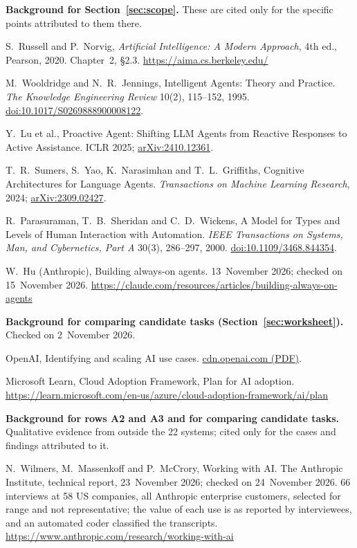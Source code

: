 \documentclass[10pt]{article}
\begin{document}
\textbf{Background for Section~\ref{sec:scope}.} These are cited only for the specific points attributed to them there.
{\small
\begin{enumerate}[label={[\arabic*]},leftmargin=2.2em,start=23]
\item S.~Russell and P.~Norvig, \emph{Artificial Intelligence: A Modern Approach}, 4th ed., Pearson, 2020. Chapter~2, \S2.3. \url{https://aima.cs.berkeley.edu/}
\item M.~Wooldridge and N.~R.~Jennings, Intelligent Agents: Theory and Practice. \emph{The Knowledge Engineering Review} 10(2), 115--152, 1995. \href{https://doi.org/10.1017/S0269888900008122}{doi:10.1017/S0269888900008122}.
\item Y.~Lu et al., Proactive Agent: Shifting LLM Agents from Reactive Responses to Active Assistance. ICLR 2025; \href{https://arxiv.org/abs/2410.12361}{arXiv:2410.12361}.
\item T.~R.~Sumers, S.~Yao, K.~Narasimhan and T.~L.~Griffiths, Cognitive Architectures for Language Agents. \emph{Transactions on Machine Learning Research}, 2024; \href{https://arxiv.org/abs/2309.02427}{arXiv:2309.02427}.
\item R.~Parasuraman, T.~B.~Sheridan and C.~D.~Wickens, A Model for Types and Levels of Human Interaction with Automation. \emph{IEEE Transactions on Systems, Man, and Cybernetics, Part A} 30(3), 286--297, 2000. \href{https://doi.org/10.1109/3468.844354}{doi:10.1109/3468.844354}.
\item W.~Hu (Anthropic), Building always-on agents. 13~November 2026; checked on 15~November 2026. \url{https://claude.com/resources/articles/building-always-on-agents}
\end{enumerate}
}

\textbf{Background for comparing candidate tasks (Section~\ref{sec:worksheet}).} Checked on 2~November 2026.
{\small
\begin{enumerate}[label={[\arabic*]},leftmargin=2.2em,start=29]
\item OpenAI, Identifying and scaling AI use cases. \href{https://cdn.openai.com/business-guides-and-resources/identifying-and-scaling-ai-use-cases.pdf}{cdn.openai.com (PDF)}.
\item Microsoft Learn, Cloud Adoption Framework, Plan for AI adoption. \url{https://learn.microsoft.com/en-us/azure/cloud-adoption-framework/ai/plan}
\end{enumerate}
}

\textbf{Background for rows A2 and A3 and for comparing candidate tasks.} Qualitative evidence from outside the 22 systems; cited only for the cases and findings attributed to it.
{\small
\begin{enumerate}[label={[\arabic*]},leftmargin=2.2em,start=31]
\item N.~Wilmers, M.~Massenkoff and P.~McCrory, Working with AI. The Anthropic Institute, technical report, 23~November 2026; checked on 24~November 2026. 66 interviews at 58 US companies, all Anthropic enterprise customers, selected for range and not representative; the value of each use is as reported by interviewees, and an automated coder classified the transcripts. \url{https://www.anthropic.com/research/working-with-ai}
\end{enumerate}
}
\end{document}
